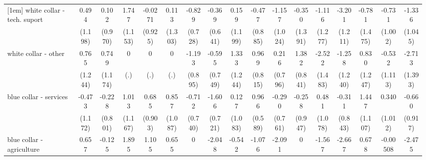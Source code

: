 {\begin{tabular}{l*{16}{c}}
[1em]
white collar - tech. suport&       0.494         &       0.102         &       1.747         &     -0.0271         &       0.113         &      -0.829         &      -0.369         &       0.159         &      -0.477         &      -1.157         &      -0.350         &      -1.116         &      -3.201\sym{**} &      -0.781         &      -0.731         &      -1.336         \\
                    &     (1.198)         &     (0.970)         &     (1.153)         &     (0.925)         &     (1.303)         &     (0.728)         &     (0.641)         &     (1.199)         &     (0.885)         &     (1.024)         &     (1.391)         &     (1.277)         &     (1.211)         &     (1.475)         &     (1.002)         &     (1.045)         \\
[1em]
white collar - other&       0.765         &       0.749         &           0         &           0         &           0         &      -1.193         &      -0.595         &       1.333         &       0.969         &       0.216         &       1.382         &      -2.522         &      -1.258         &       0.830         &      -0.532         &      -2.713         \\
                    &     (1.244)         &     (1.174)         &         (.)         &         (.)         &         (.)         &     (0.895)         &     (0.749)         &     (1.244)         &     (0.815)         &     (0.796)         &     (0.841)         &     (1.483)         &     (1.240)         &     (1.247)         &     (1.113)         &     (1.393)         \\
[1em]
blue collar - services&      -0.473         &      -0.228         &       1.013         &       0.685         &       0.857         &      -0.712         &      -1.606\sym{*}  &       0.127         &       0.966         &      -0.290         &      -0.258         &       0.481         &      -0.311         &       1.447         &       0.340         &      -0.660         \\
                    &     (1.172)         &     (0.801)         &     (1.167)         &     (0.903)         &     (1.087)         &     (0.740)         &     (0.721)         &     (1.083)         &     (0.589)         &     (0.761)         &     (0.947)         &     (1.078)         &     (0.843)         &     (1.107)         &     (1.012)         &     (0.917)         \\
[1em]
blue collar - agriculture&       0.657         &      -0.125         &       1.895         &       1.105         &       0.655         &           0         &      -2.048         &      -0.542         &      -1.076         &      -2.091         &           0         &      -1.567         &      -2.667\sym{*}  &       0.678         &    -0.00508         &      -2.475         \\

\end{tabular}}

